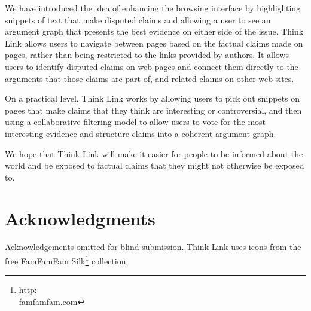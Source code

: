 \documentclass{chi2009}
\newcommand{\todo}[1]{}
\begin{document}
We have introduced the idea of enhancing the browsing interface by highlighting snippets of text that make disputed claims and allowing a user to see an argument graph that presents the best evidence on either side of the issue. Think Link allows users to navigate between pages based on the factual claims made on pages, rather than being restricted to the links provided by authors. It allows users to identify disputed claims on web pages and connect them directly to the arguments that those claims are part of, and related claims on other web sites.

On a practical level, Think Link works by allowing users to pick out snippets on pages that make claims that they think are interesting or controversial, and then using a collaborative filtering model to allow users to vote for the most interesting evidence and structure claims into a coherent argument graph.

We hope that Think Link will make it easier for people to be informed about the world and be exposed to factual claims that they might not otherwise be exposed to.

\section{Acknowledgments}

Acknowledgements omitted for blind submission. Think Link uses icons from the free FamFamFam Silk\footnote{http:\\famfamfam.com} collection.


\todo{Sort out bad references}

\end{document}
